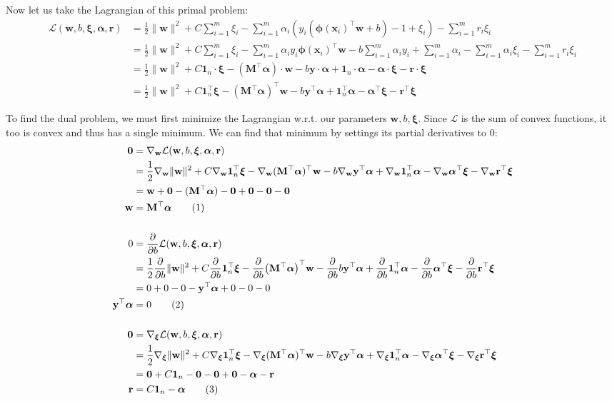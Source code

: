 \documentclass{article}
\renewcommand{\vec}[1]{\mathbf{#1}}
\renewcommand{\grad}[1]{\nabla_{#1}}
\newcommand{\mat}[1]{\mathbf{#1}}
\begin{document}
Now let us take the Lagrangian of this primal problem:
\begin{align*}
    \mathcal L(\vec w,b,\bm\xi,\bm\alpha,\vec r)&=\frac{1}{2}\|\vec w\|^2+C\sum_{i=1}^m\xi_i-\sum_{i=1}^m\alpha_i(y_i(\bm\phi(\vec x_i)^\top\vec w+b)-1+\xi_i)-\sum_{i=1}^mr_i\xi_i\\
    &=\frac{1}{2}\|\vec w\|^2+C\sum_{i=1}^m\xi_i-\sum_{i=1}^m\alpha_iy_i\bm\phi(\vec x_i)^\top\vec w-b\sum_{i=1}^m\alpha_iy_i+\sum_{i=1}^m\alpha_i-\sum_{i=1}^m\alpha_i\xi_i-\sum_{i=1}^mr_i\xi_i\\
    &=\frac{1}{2}\|\vec w\|^2+C\vec1_n\cdot\bm\xi-(\mat M^\top\bm\alpha)\cdot\vec w-b\vec y\cdot\bm\alpha+\vec1_n\cdot\bm\alpha-\bm\alpha\cdot\bm\xi-\vec r\cdot\bm\xi\\
    &=\frac{1}{2}\|\vec w\|^2+C\vec1_n^\top\bm\xi-(\mat M^\top\bm\alpha)^\top\vec w-b\vec y^\top\bm\alpha+\vec1_n^\top\bm\alpha-\bm\alpha^\top\bm\xi-\vec r^\top\bm\xi
\end{align*}
\newpage

To find the dual problem, we must first minimize the Lagrangian w.r.t. our parameters $\vec w,b,\bm\xi$. Since $\mathcal L$ is the sum of convex functions, it too is convex and thus has a single minimum. We can find that minimum by settings its partial derivatives to 0:
\begin{align*}
    \vec 0&=\grad{\vec w}\mathcal L(\vec w,b,\bm\xi,\bm\alpha,\vec r)\\
    &=\frac{1}{2}\grad{\vec w}\|\vec w\|^2+C\grad{\vec w}\vec1_n^\top\bm\xi-\grad{\vec w}(\mat M^\top\bm\alpha)^\top\vec w-b\grad{\vec w}\vec y^\top\bm\alpha+\grad{\vec w}\vec1_n^\top\bm\alpha-\grad{\vec w}\bm\alpha^\top\bm\xi-\grad{\vec w}\vec r^\top\bm\xi\\
    &=\vec w+\vec 0-(\mat M^\top\bm\alpha)-\vec 0+\vec 0-\vec 0-\vec 0\\
    \vec w&=\mat M^\top\bm\alpha\tag{1}\\
    \\
    0&=\pdv{b}\mathcal L(\vec w,b,\bm\xi,\bm\alpha,\vec r)\\
    &=\frac{1}{2}\pdv{b}\|\vec w\|^2+C\pdv{b}\vec1_n^\top\bm\xi-\pdv{b}(\mat M^\top\bm\alpha)^\top\vec w-\pdv{b}b\vec y^\top\bm\alpha+\pdv{b}\vec1_n^\top\bm\alpha-\pdv{b}\bm\alpha^\top\bm\xi-\pdv{b}\vec r^\top\bm\xi\\
    &=0+0-0-\vec y^\top\bm\alpha+0-0-0\\
    \vec y^\top\bm\alpha&=0\tag{2}\\
    \\
    \vec 0&=\grad{\bm\xi}\mathcal L(\vec w,b,\bm\xi,\bm\alpha,\vec r)\\
    &=\frac{1}{2}\grad{\bm\xi}\|\vec w\|^2+C\grad{\bm\xi}\vec1_n^\top\bm\xi-\grad{\bm\xi}(\mat M^\top\bm\alpha)^\top\vec w-b\grad{\bm\xi}\vec y^\top\bm\alpha+\grad{\bm\xi}\vec1_n^\top\bm\alpha-\grad{\bm\xi}\bm\alpha^\top\bm\xi-\grad{\bm\xi}\vec r^\top\bm\xi\\
    &=\vec 0+C\vec1_n-\vec 0-\vec 0+\vec 0-\bm\alpha-\vec r\\
    \vec r&=C\vec1_n-\bm\alpha\tag{3}
\end{align*}
\end{document}
